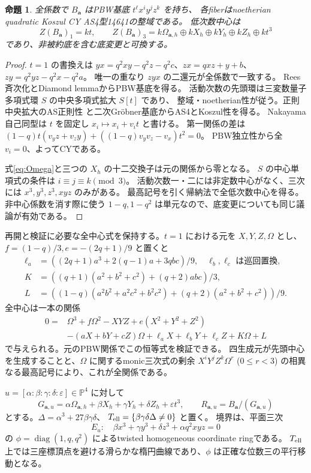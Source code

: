 \documentclass[11pt,a4paper]{ltjsarticle}
\newtheorem{proposition}[theorem]{命題}
\theoremstyle{definition}\newtheorem{definition}[theorem]{定義}
\theoremstyle{remark}\newtheorem{remark}[theorem]{注意}
\newcommand{\PP}{\mathbb P}
\begin{document}
\begin{proposition}\label{prop:pbw}
全係数で $B_{\mathbf a}$ はPBW基底 $t^\ell x^iy^jz^k$ を持ち、
各fiberはnoetherian quadratic Koszul CY AS4型14641の整域である。
低次数中心は
\[
Z(B_{\mathbf a})_1=kt,\qquad
Z(B_{\mathbf a})_3=k\Omega_{\mathbf a,h}\oplus kX_h\oplus kY_h\oplus kZ_h\oplus kt^3
\]
であり、非被約底を含む底変更と可換する。
\end{proposition}
\begin{proof}
$t=1$ の書換えは
$yx=q^2xy-q^2z-q^2c$、$zx=qxz+y+b$、$zy=q^2yz-q^2x-q^2a$。
唯一の重なり $zyx$ の二還元が全係数で一致する。
Rees斉次化とDiamond lemmaからPBW基底を得る。
活動次数の先頭環は三変数量子多項式環 $S$ の中央多項式拡大 $S[t]$ であり、
整域・noetherian性が従う。正則中央拡大のAS正則性 \cite{LBS} と二次Gr\"obner基底からAS4とKoszul性を得る。
Nakayama自己同型は $t$ を固定し $x_i\mapsto x_i+v_it$ と書ける。
第一関係の差は
$(1-q)t(v_yz+v_zy)+((1-q)v_yv_z-v_x)t^2=0$。
PBW独立性から全 $v_i=0$、よってCYである。

式\eqref{eq:Omega}と三つの $X_h$ の十二交換子は元の関係から零となる。
$S$ の中心単項式の条件は $i\equiv j\equiv k\pmod3$。
活動次数一・二には非定数中心がなく、三次には $x^3,y^3,z^3,xyz$ のみがある。
最高記号を引く帰納法で全低次数中心を得る。
非中心係数を消す際に使う $1-q,1-q^2$ は単元なので、底変更についても同じ議論が有効である。
\end{proof}

再開と検証に必要な全中心式を保持する。$t=1$ における元を $X,Y,Z,\Omega$ とし、
$f=(1-q)/3,e=-(2q+1)/9$ と置くと
\begin{align*}
\ell_a&=((2q+1)a^3+2(q-1)a+3qbc)/9,\quad \ell_b,\ell_c\text{ は巡回置換},\\
K&=((q+1)(a^2+b^2+c^2)+(q+2)abc)/3,\\
L&=((1-q)(a^2b^2+a^2c^2+b^2c^2)+(q+2)(a^2+b^2+c^2))/9.
\end{align*}
全中心は一本の関係
\begin{equation}\label{eq:center}
\begin{split}
0={}&\Omega^3+f\Omega^2-XYZ+e(X^2+Y^2+Z^2)\\
&-(aX+bY+cZ)\Omega+\ell_aX+\ell_bY+\ell_cZ+K\Omega+L
\end{split}
\end{equation}
で与えられる。元のPBW関係でこの恒等式を検証できる。
四生成元が先頭中心を生成することと、$\Omega$ に関するmonic三次式の剰余
$X^iY^jZ^k\Omega^r$ ($0\le r<3$) の相異なる最高記号により、これが全関係である。

$u=[\alpha:\beta:\gamma:\delta:\varepsilon]\in\PP^4$ に対して
\[
G_{\mathbf a,u}=\alpha\Omega_{\mathbf a,h}+\beta X_h+\gamma Y_h+\delta Z_h+\varepsilon t^3,
\qquad R_{\mathbf a,u}=B_{\mathbf a}/(G_{\mathbf a,u})
\]
とする。$\Delta=\alpha^3+27\beta\gamma\delta$、
$T_{\rm ell}=\{\beta\gamma\delta\Delta\ne0\}$ と置く。
境界は、平面三次
\[
E_u:\quad \beta x^3+\gamma y^3+\delta z^3+\alpha q^2xyz=0
\]
の $\phi=\operatorname{diag}(1,q,q^2)$ によるtwisted homogeneous coordinate ringである。
$T_{\rm ell}$ 上では三座標頂点を避ける滑らかな楕円曲線であり、$\phi$ は正確な位数三の平行移動となる。
\end{document}
